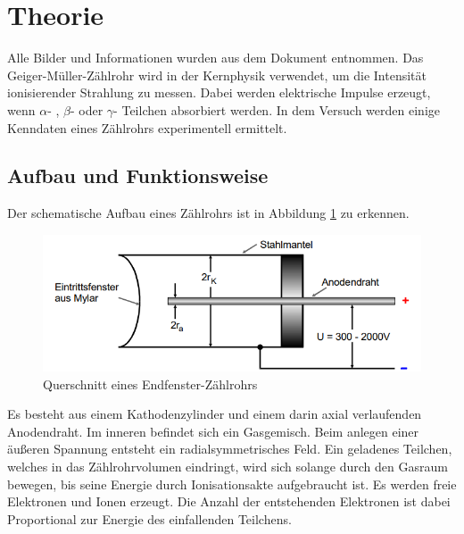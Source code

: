 \section{Theorie}
\label{sec:Theorie}
Alle Bilder und Informationen wurden aus dem Dokument \cite{v703} entnommen.
Das Geiger-Müller-Zählrohr wird in der Kernphysik verwendet, um die Intensität ionisierender Strahlung zu messen.
Dabei werden elektrische Impulse erzeugt, wenn $\alpha$- , $\beta$- oder $\gamma$- Teilchen absorbiert werden. In dem Versuch werden
einige Kenndaten eines Zählrohrs experimentell ermittelt.
\subsection{Aufbau und Funktionsweise}
Der schematische Aufbau eines Zählrohrs ist in Abbildung \ref{fig:aufbau} zu erkennen.
\begin{figure}
    \centering
    \includegraphics[scale=0.4]{pics/Aufbau.png}
    \caption{Querschnitt eines Endfenster-Zählrohrs}
    \label{fig:aufbau}
  \end{figure}
Es besteht aus einem Kathodenzylinder und einem darin axial verlaufenden Anodendraht. Im inneren befindet sich ein Gasgemisch.
Beim anlegen einer äußeren Spannung entsteht ein radialsymmetrisches Feld. Ein geladenes Teilchen, welches in das Zählrohrvolumen eindringt,
wird sich solange durch den Gasraum bewegen, bis seine Energie durch Ionisationsakte aufgebraucht ist. 
Es werden freie Elektronen und Ionen erzeugt. Die Anzahl der entstehenden Elektronen ist dabei Proportional zur Energie des einfallenden Teilchens.

